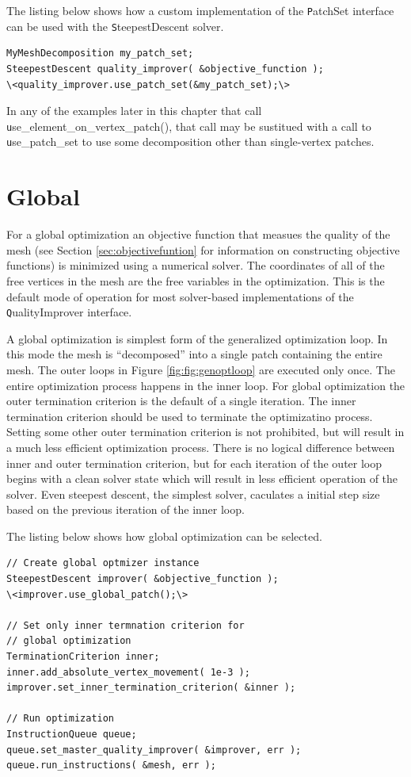 The listing below shows how a custom implementation of the {\texttt PatchSet} interface can be used with the {\texttt SteepestDescent} solver.

\begin{lstlisting}[frame=single]
MyMeshDecomposition my_patch_set;
SteepestDescent quality_improver( &objective_function );
\<quality_improver.use_patch_set(&my_patch_set);\>
\end{lstlisting}

In any of the examples later in this chapter that call {\texttt use\_element\_on\_vertex\_patch()}, that call may be sustitued with a call to {\texttt use\_patch\_set} to use some decomposition other than single-vertex patches.

\section{Global \label{sec:global}}

For a global optimization an objective function that measues the quality of the mesh (see Section \ref{sec:objectivefuntion} for information on constructing objective functions) is minimized using a numerical solver.  The coordinates of all of the free vertices in the mesh are the free variables in the optimization.  This is the default mode of operation for most solver-based implementations of the {\texttt QualityImprover} interface.

A global optimization is simplest form of the generalized optimization loop.  In this mode the mesh is ``decomposed'' into a single patch containing the entire mesh.  The outer loops in Figure \ref{fig:fig:genoptloop} are executed only once.  The entire optimization process happens in the inner loop.  For global optimization the outer termination criterion is the default of a single iteration.  The inner termination criterion should be used to terminate the optimizatino process.  Setting some other outer termination criterion is not prohibited, but will result in a much less efficient optimization process.  There is no logical difference between inner and outer termination criterion, but for each iteration of the outer loop begins with a clean solver state which will result in less efficient operation of the solver.  Even steepest descent, the simplest solver, caculates a initial step size based on the previous iteration of the inner loop.  

The listing below shows how global optimization can be selected.

\begin{lstlisting}[frame=single]
// Create global optmizer instance
SteepestDescent improver( &objective_function );
\<improver.use_global_patch();\>

// Set only inner termnation criterion for 
// global optimization
TerminationCriterion inner;
inner.add_absolute_vertex_movement( 1e-3 );
improver.set_inner_termination_criterion( &inner );

// Run optimization
InstructionQueue queue;
queue.set_master_quality_improver( &improver, err );
queue.run_instructions( &mesh, err );
\end{lstlisting}

